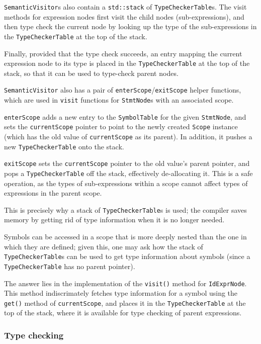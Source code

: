 \documentclass[11pt,a4paper]{scrartcl}
\begin{document}
\verb|SemanticVisitor|s also contain a \verb|std::stack| of \verb|TypeCheckerTable|s. The visit methods for expression nodes first visit the child nodes (sub-expressions), and then type check the current node by looking up the type of the sub-expressions in the \verb|TypeCheckerTable| at the top of the stack.

Finally, provided that the type check succeeds, an entry mapping the current expression node to its type is placed in the \verb|TypeCheckerTable| at the top of the stack, so that it can be used to type-check parent nodes.

\verb|SemanticVisitor| also has a pair of \verb|enterScope|/\verb|exitScope| helper functions, which are used in \verb|visit| functions for \verb|StmtNode|s with an associated scope.

\verb|enterScope| adds a new entry to the \verb|SymbolTable| for the given \verb|StmtNode|, and sets the \verb|currentScope| pointer to point to the newly created \verb|Scope| instance (which has the old value of \verb|currentScope| as its parent). In addition, it pushes a new \verb|TypeCheckerTable| onto the stack.

\verb|exitScope| sets the \verb|currentScope| pointer to the old value's parent pointer, and pops a \verb|TypeCheckerTable| off the stack, effectively de-allocating it. This is a safe operation, as the types of sub-expressions within a scope cannot affect types of expressions in the parent scope.

This is precisely why a stack of \verb|TypeCheckerTable|s is used; the compiler saves memory by getting rid of type information when it is no longer needed.

Symbols can be accessed in a scope that is more deeply nested than the one in which they are defined; given this, one may ask how the stack of \verb|TypeCheckerTable|s can be used to get type information about symbols (since a \verb|TypeCheckerTable| has no parent pointer).

The answer lies in the implementation of the \verb|visit()| method for \verb|IdExprNode|. This method indiscrimately fetches type information for a symbol using the \verb|get()| method of \verb|currentScope|, and places it in the \verb|TypeCheckerTable| at the top of the stack, where it is available for type checking of parent expressions.

\subsubsection{Type checking}~\label{sec:type-checking}
\end{document}
